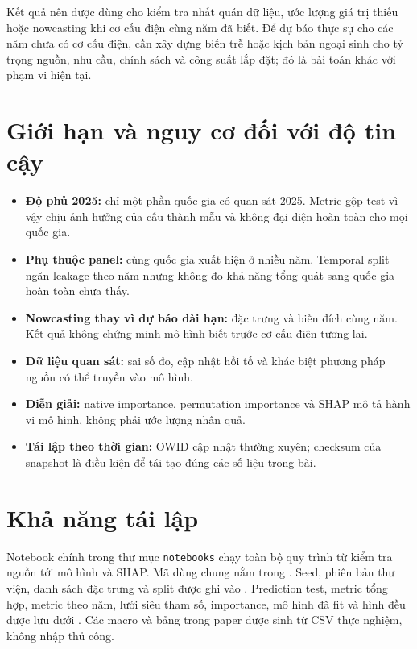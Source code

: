 \documentclass[11pt,a4paper]{article}
\begin{document}
Kết quả nên được dùng cho kiểm tra nhất quán dữ liệu, ước lượng giá trị thiếu hoặc
nowcasting khi cơ cấu điện cùng năm đã biết. Để dự báo thực sự cho các năm chưa
có cơ cấu điện, cần xây dựng biến trễ hoặc kịch bản ngoại sinh cho tỷ trọng nguồn,
nhu cầu, chính sách và công suất lắp đặt; đó là bài toán khác với phạm vi hiện tại.

\section{Giới hạn và nguy cơ đối với độ tin cậy}

\begin{itemize}
  \item \textbf{Độ phủ 2025:} chỉ một phần quốc gia có quan sát 2025. Metric gộp
  test vì vậy chịu ảnh hưởng của cấu thành mẫu và không đại diện hoàn toàn cho
  mọi quốc gia.
  \item \textbf{Phụ thuộc panel:} cùng quốc gia xuất hiện ở nhiều năm. Temporal
  split ngăn leakage theo năm nhưng không đo khả năng tổng quát sang quốc gia
  hoàn toàn chưa thấy.
  \item \textbf{Nowcasting thay vì dự báo dài hạn:} đặc trưng và biến đích cùng
  năm. Kết quả không chứng minh mô hình biết trước cơ cấu điện tương lai.
  \item \textbf{Dữ liệu quan sát:} sai số đo, cập nhật hồi tố và khác biệt phương
  pháp nguồn có thể truyền vào mô hình.
  \item \textbf{Diễn giải:} native importance, permutation importance và SHAP
  mô tả hành vi mô hình, không phải ước lượng nhân quả.
  \item \textbf{Tái lập theo thời gian:} OWID cập nhật thường xuyên; checksum của
  snapshot là điều kiện để tái tạo đúng các số liệu trong bài.
\end{itemize}

\section{Khả năng tái lập}

Notebook chính trong thư mục \texttt{notebooks} chạy toàn bộ quy trình từ kiểm
tra nguồn tới mô hình và SHAP. Mã dùng chung nằm
trong . Seed, phiên bản thư viện,
danh sách đặc trưng và split được ghi vào . Prediction
test, metric tổng hợp, metric theo năm, lưới siêu tham số, importance, mô hình
đã fit và hình đều được lưu dưới . Các macro
và bảng trong paper được sinh từ CSV thực nghiệm, không nhập thủ công.
\end{document}
